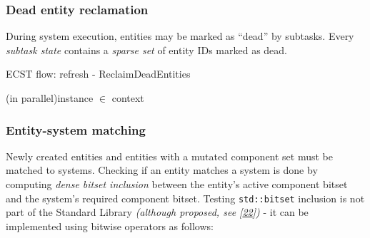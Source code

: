 \documentclass[twoside, 12pt, a4paper, openany]{book}
\begin{document}
\subsubsection{Dead entity reclamation}\label{dead-entity-reclamation}

During system execution, entities may be marked as ``dead'' by subtasks.
Every \emph{subtask state} contains a \emph{sparse set} of entity IDs
marked as dead.

\begin{algorithm}[H]
\caption{ECST flow: refresh - ReclaimDeadEntities}
\footnotesize



    \BlankLine

    \ForEach(in parallel){instance \I $\in$ context \C}{
    }

    \BlankLine


\end{algorithm}

\subsubsection{Entity-system matching}\label{entity-system-matching}

Newly created entities and entities with a mutated component set must be
matched to systems. Checking if an entity matches a system is done by
computing \emph{dense bitset inclusion} between the entity's active
component bitset and the system's required component bitset. Testing
\texttt{std::bitset}
inclusion is not part of the Standard Library \emph{(although proposed,
see {[}\protect\hyperlink{ref-isocpp_proposal_p0125r0}{22}{]})} - it can
be implemented using bitwise operators as follows:
\end{document}
